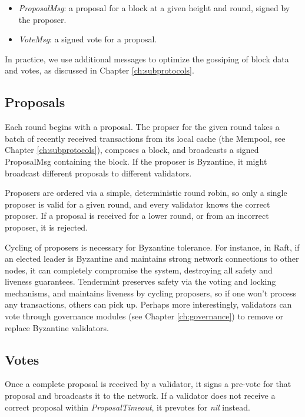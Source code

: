 \begin{itemize}
\item{\emph{ProposalMsg}: a proposal for a block at a given height and round, signed by the proposer.}
\item{\emph{VoteMsg}: a signed vote for a proposal.}
\end{itemize}

In practice, we use additional messages to optimize the gossiping of block data and votes, as discussed in Chapter \ref{ch:subprotocols}.

\subsection{Proposals}

Each round begins with a proposal. 
The propser for the given round takes a batch of recently received transactions from its local cache (the Mempool, see Chapter \ref{ch:subprotocols}),
composes a block, and broadcasts a signed ProposalMsg containing the block.
If the proposer is Byzantine, it might broadcast different proposals to different validators.

Proposers are ordered via a simple, deterministic round robin, 
so only a single proposer is valid for a given round, 
and every validator knows the correct proposer. 
If a proposal is received for a lower round, or from an incorrect proposer, it is rejected.

Cycling of proposers is necessary for Byzantine tolerance. 
For instance, in Raft, if an elected leader is Byzantine and maintains strong network connections to other nodes,
it can completely compromise the system, destroying all safety and liveness guarantees.
Tendermint preserves safety via the voting and locking mechanisms, 
and maintains liveness by cycling proposers, so if one won't process any transactions, others can pick up.
Perhaps more interestingly, validators can vote through governance modules (see Chapter \ref{ch:governance}) to remove or replace Byzantine validators.

\subsection{Votes}

Once a complete proposal is received by a validator, 
it signs a pre-vote for that proposal and broadcasts it to the network.
If a validator does not receive a correct proposal within \emph{ProposalTimeout}, 
it prevotes for \emph{nil} instead.

